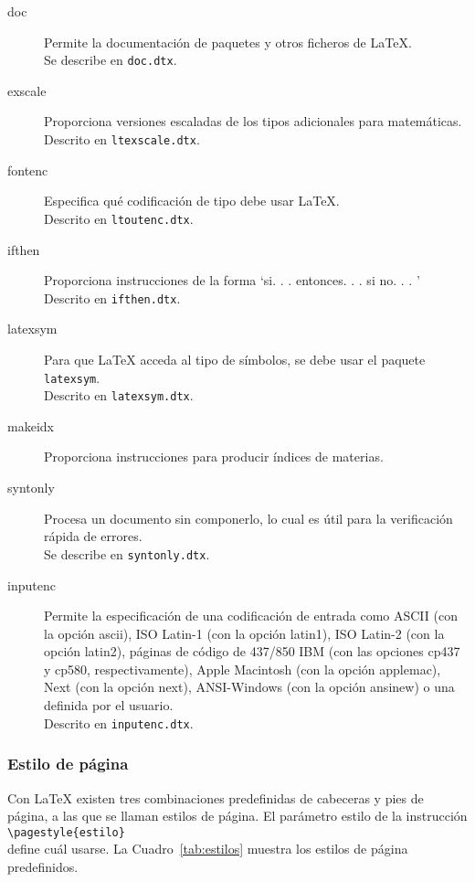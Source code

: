 \begin{table}[htbp]
\centering
	\hrulefill
	\begin{description}
	\item[doc] Permite la documentaci\'on de paquetes y otros ficheros de \LaTeX{}.\\ Se describe en \texttt{doc.dtx}. 
	\item[exscale] Proporciona versiones escaladas de los tipos adicionales para matem\'aticas.\\
					Descrito en \texttt{ltexscale.dtx}.  
	\item[fontenc] Especifica qu\'e codificaci\'on de tipo debe usar \LaTeX{}.\\
					Descrito en \texttt{ltoutenc.dtx}.
	\item[ifthen] Proporciona instrucciones de la forma `si. . . entonces. . . si no. . . '\\
					Descrito en \texttt{ifthen.dtx}.
	\item[latexsym] Para que \LaTeX{} acceda al tipo de s\'imbolos, se debe usar el paquete \texttt{latexsym}.\\
					Descrito en \texttt{latexsym.dtx}.
	\item[makeidx] Proporciona instrucciones para producir \'indices de materias.
	\item[syntonly] Procesa un documento sin componerlo, lo cual es \'util para la verificaci\'on r\'apida de errores.\\
					Se describe en \texttt{syntonly.dtx}.
	\item[inputenc] Permite la especificaci\'on de una codificaci\'on de entrada como ASCII (con la opci\'on ascii), 
					ISO Latin-1 (con la opci\'on latin1), ISO Latin-2 (con la opci\'on latin2), p\'aginas de c\'odigo de 
					437/850 IBM (con las opciones cp437 y cp580, respectivamente), Apple Macintosh (con la opci\'on applemac), 
					Next (con la opci\'on next), ANSI-Windows (con la opci\'on ansinew) o una definida por el usuario.\\ 
					Descrito en \texttt{inputenc.dtx}.
	\end{description}
	\hrulefill
\caption{Algunos paquetes distribuidos con \LaTeX{}}
\label{tab:paquetes}
\end{table}
		
				\subsubsection{Estilo de p\'agina}
				Con \LaTeX{} existen tres combinaciones predefinidas de cabeceras y pies de p\'agina, a las que se llaman 
				estilos de p\'agina. El par\'ametro estilo de la instrucci\'on\\
							\verb+\pagestyle{estilo}+\\
				define cu\'al usarse. La Cuadro~\ref{tab:estilos} muestra los estilos de p\'agina predefinidos.\\ 


